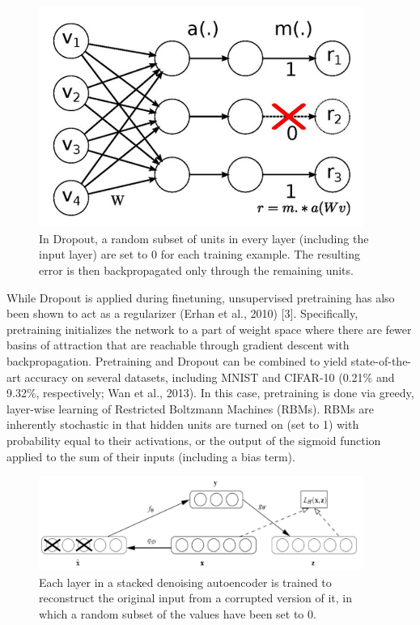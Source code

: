 \documentclass{article} %
\begin{document}
\begin{figure}[h!]
\begin{center}
\includegraphics[width=300pt]{Dropout_Figure.png}
\caption{In Dropout, a random subset of units in every layer (including the input layer) are set to 0 for each training example. The resulting error is then backpropagated only through the remaining units.}
\end{center}
\end{figure}

While Dropout is applied during finetuning, unsupervised pretraining has also been shown to act as a regularizer (Erhan et al., 2010) [3]. Specifically, pretraining initializes the network to a part of weight space where there are fewer basins of attraction that are reachable through gradient descent with backpropagation. Pretraining and Dropout can be combined to yield state-of-the-art accuracy on several datasets, including MNIST and CIFAR-10 (0.21\% and 9.32\%, respectively; Wan et al., 2013). In this case, pretraining is done via greedy, layer-wise learning of Restricted Boltzmann Machines (RBMs). RBMs are inherently stochastic in that hidden units are turned on (set to 1) with probability equal to their activations, or the output of the sigmoid function applied to the sum of their inputs (including a bias term).

\begin{figure}[h!]
\begin{center}
\includegraphics[width=300pt]{SDAE_Figure.png}
\caption{Each layer in a stacked denoising autoencoder is trained to reconstruct the original input from a corrupted version of it, in which a random subset of the values have been set to 0.}
\end{center}
\end{figure}
\end{document}
